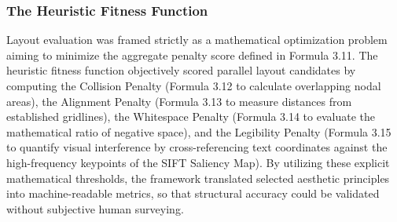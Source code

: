 \begin{refsection}
\subsubsection{The Heuristic Fitness Function}
Layout evaluation was framed strictly as a mathematical optimization problem aiming to minimize the aggregate penalty score defined in Formula 3.11. The heuristic fitness function objectively scored parallel layout candidates by computing the Collision Penalty (Formula 3.12 to calculate overlapping nodal areas), the Alignment Penalty (Formula 3.13 to measure distances from established gridlines), the Whitespace Penalty (Formula 3.14 to evaluate the mathematical ratio of negative space), and the Legibility Penalty (Formula 3.15 to quantify visual interference by cross-referencing text coordinates against the high-frequency keypoints of the SIFT Saliency Map). By utilizing these explicit mathematical thresholds, the framework translated selected aesthetic principles into machine-readable metrics, so that structural accuracy could be validated without subjective human surveying.


\end{refsection}
